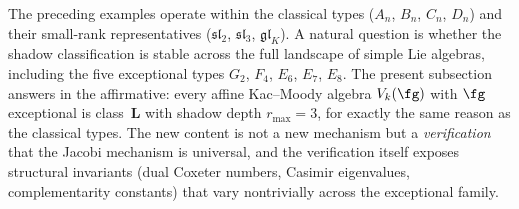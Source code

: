 The preceding examples operate within the classical types
($A_n$, $B_n$, $C_n$, $D_n$) and their small-rank representatives
($\mathfrak{sl}_2$, $\mathfrak{sl}_3$, $\mathfrak{gl}_K$). A natural
question is whether the shadow classification is stable across the
full landscape of simple Lie algebras, including the five exceptional
types $G_2$, $F_4$, $E_6$, $E_7$, $E_8$. The present subsection
answers in the affirmative: every affine Kac--Moody algebra
$V_k(\fg)$ with $\fg$ exceptional is class~$\mathbf{L}$ with shadow
depth $r_{\max} = 3$, for exactly the same reason as the classical
types. The new content is not a new mechanism but a
\emph{verification} that the Jacobi mechanism is universal, and the
verification itself exposes structural invariants (dual Coxeter
numbers, Casimir eigenvalues, complementarity constants) that vary
nontrivially across the exceptional family.

